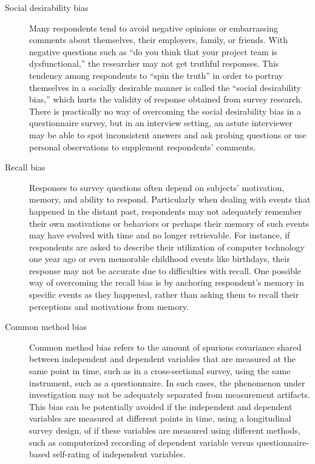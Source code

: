 \begin{description}
\item[Social desirability bias] Many respondents tend to avoid negative opinions or embarrassing comments about themselves, their employers, family, or friends. With negative questions such as ``do you think that your project team is dysfunctional,'' the researcher may not get truthful responses. This tendency among respondents to ``spin the truth'' in order to portray themselves in a socially desirable manner is called the ``social desirability bias,'' which hurts the validity of response obtained from survey research. There is practically no way of overcoming the social desirability bias in a questionnaire survey, but in an interview setting, an astute interviewer may be able to spot inconsistent answers and ask probing questions or use personal observations to supplement respondents' comments.

\item[Recall bias] Responses to survey questions often depend on subjects' motivation, memory, and ability to respond. Particularly when dealing with events that happened in the distant past, respondents may not adequately remember their own motivations or behaviors or perhaps their memory of such events may have evolved with time and no longer retrievable. For instance, if respondents are asked to describe their utilization of computer technology one year ago or even memorable childhood events like birthdays, their response may not be accurate due to difficulties with recall. One possible way of overcoming the recall bias is by anchoring respondent's memory in specific events as they happened, rather than asking them to recall their perceptions and motivations from memory.

\item[Common method bias] Common method bias refers to the amount of spurious covariance shared between independent and dependent variables that are measured at the same point in time, such as in a cross-sectional survey, using the same instrument, such as a questionnaire. In such cases, the phenomenon under investigation may not be adequately separated from measurement artifacts. This bias can be potentially avoided if the independent and dependent variables are measured at different points in time, using a longitudinal survey design, of if these variables are measured using different methods, such as computerized recording of dependent variable versus questionnaire-based self-rating of independent variables.

\end{description}

